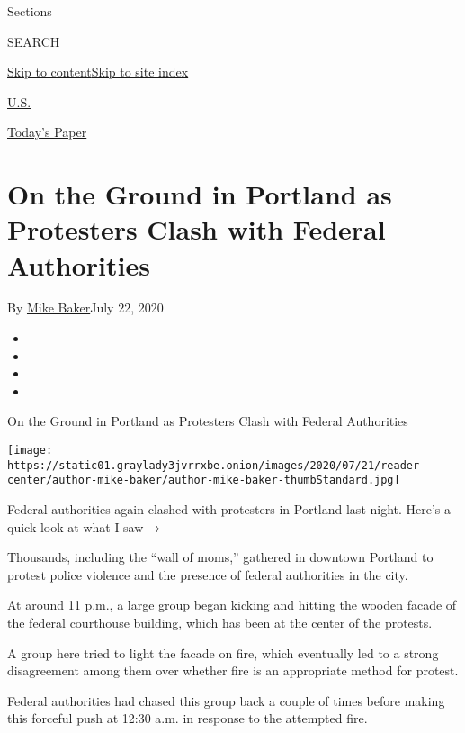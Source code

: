 Sections

SEARCH

\protect\hyperlink{site-content}{Skip to
content}\protect\hyperlink{site-index}{Skip to site index}

\href{https://www.nytimes3xbfgragh.onion/section/us}{U.S.}

\href{https://myaccount.nytimes3xbfgragh.onion/auth/login?response_type=cookie\&client_id=vi}{}

\href{https://www.nytimes3xbfgragh.onion/section/todayspaper}{Today's
Paper}

\hypertarget{on-the-ground-in-portland-as-protesters-clash-with-federal-authorities}{%
\section{On the Ground in Portland as Protesters Clash with Federal
Authorities}\label{on-the-ground-in-portland-as-protesters-clash-with-federal-authorities}}

By \href{https://www.nytimes3xbfgragh.onion/by/mike-baker}{Mike
Baker}July 22, 2020

\begin{itemize}
\item
\item
\item
\item
\end{itemize}

On the Ground in Portland as Protesters Clash with Federal Authorities

\texttt{[image: https://static01.graylady3jvrrxbe.onion/images/2020/07/21/reader-center/author-mike-baker/author-mike-baker-thumbStandard.jpg]}

Federal authorities again clashed with protesters in Portland last
night. Here's a quick look at what I saw →

Thousands, including the ``wall of moms,'' gathered in downtown Portland
to protest police violence and the presence of federal authorities in
the city.

At around 11 p.m., a large group began kicking and hitting the wooden
facade of the federal courthouse building, which has been at the center
of the protests.

A group here tried to light the facade on fire, which eventually led to
a strong disagreement among them over whether fire is an appropriate
method for protest.

Federal authorities had chased this group back a couple of times before
making this forceful push at 12:30 a.m. in response to the attempted
fire.

